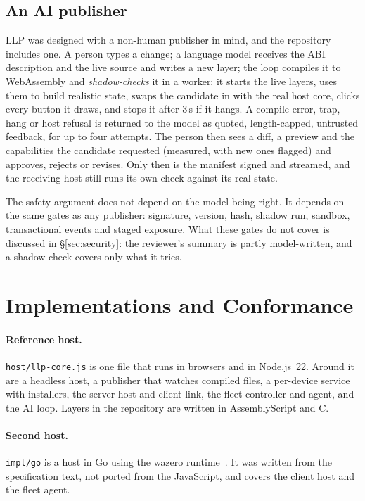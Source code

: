 \documentclass[10pt,twocolumn]{article}
\newcommand{\code}[1]{\texttt{#1}}
\newcommand{\s}{\,s\xspace}
\begin{document}
\subsection{An AI publisher}
\label{sec:ai}

LLP was designed with a non-human publisher in mind, and the repository includes one. A person
types a change; a language model receives the ABI description and the live source and writes a new
layer; the loop compiles it to WebAssembly and \emph{shadow-checks} it in a worker: it starts the
live layers, uses them to build realistic state, swaps the candidate in with the real host core,
clicks every button it draws, and stops it after 3\s if it hangs. A compile error, trap, hang or
host refusal is returned to the model as quoted, length-capped, untrusted feedback, for up to four
attempts. The person then sees a diff, a preview and the capabilities the candidate requested
(measured, with new ones flagged) and approves, rejects or revises. Only then is the manifest
signed and streamed, and the receiving host still runs its own check against its real state.

The safety argument does not depend on the model being right. It depends on the same gates as any
publisher: signature, version, hash, shadow run, sandbox, transactional events and staged
exposure. What these gates do not cover is discussed in \S\ref{sec:security}: the reviewer's
summary is partly model-written, and a shadow check covers only what it tries.

\section{Implementations and Conformance}
\label{sec:impl}

\paragraph{Reference host.} \code{host/llp-core.js} is one file that runs in browsers and in
Node.js~22. Around it are a headless host, a publisher that watches compiled files, a per-device
service with installers, the server host and client link, the fleet controller and agent, and the
AI loop. Layers in the repository are written in AssemblyScript and C.

\paragraph{Second host.} \code{impl/go} is a host in Go using the wazero
runtime~\cite{wazero}. It was written from the specification text, not ported from the JavaScript,
and covers the client host and the fleet agent.
\end{document}
